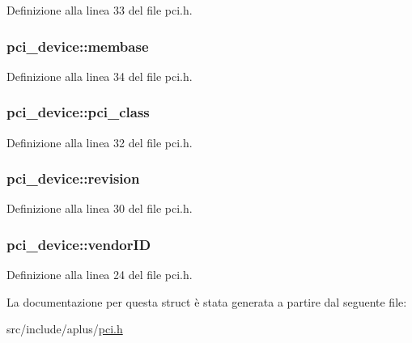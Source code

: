 Definizione alla linea 33 del file pci.\+h.

\hypertarget{structpci__device_a795ff4e1dc77af09805c41d96766b64b}{
\subsubsection[{membase}]{ pci\+\_\+device\+::membase}}\label{structpci__device_a795ff4e1dc77af09805c41d96766b64b}


Definizione alla linea 34 del file pci.\+h.

\hypertarget{structpci__device_ae1867eca43c8f867951963a1753649ea}{
\subsubsection[{pci\+\_\+class}]{ pci\+\_\+device\+::pci\+\_\+class}}\label{structpci__device_ae1867eca43c8f867951963a1753649ea}


Definizione alla linea 32 del file pci.\+h.

\hypertarget{structpci__device_ad6450a83a220d2015cb94a9698580668}{
\subsubsection[{revision}]{ pci\+\_\+device\+::revision}}\label{structpci__device_ad6450a83a220d2015cb94a9698580668}


Definizione alla linea 30 del file pci.\+h.

\hypertarget{structpci__device_ac9682451216985995a3601f14239dc26}{
\subsubsection[{vendor\+I\+D}]{ pci\+\_\+device\+::vendor\+I\+D}}\label{structpci__device_ac9682451216985995a3601f14239dc26}


Definizione alla linea 24 del file pci.\+h.



La documentazione per questa struct è stata generata a partire dal seguente file\+:\begin{DoxyCompactItemize}
\item 
src/include/aplus/\hyperlink{pci_8h}{pci.\+h}\end{DoxyCompactItemize}
